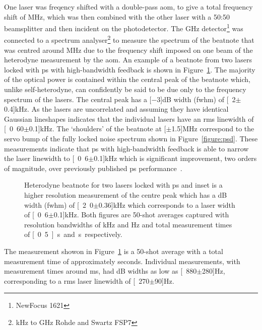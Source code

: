 One laser was freqency shifted with a double-pass \gls{aom}, to give a total frequency shift of \unit[160]{MHz}, which was then combined with the other laser with a 50:50 beamsplitter and then incident on the photodetector.
The \unit[1]{GHz} detector\footnote{NewFocus 1621} was connected to a spectrum analyser\footnote{\unit[9]{kHz} to \unit[7]{GHz} Rohde and Swartz FSP7} to measure the spectrum of the beatnote that was centred around \unit[160]{MHz} due to the frequency shift imposed on one beam of the heterodyne measurement by the \gls{aom}.
An example of a beatnote from two lasers locked with \gls{ps} with high-bandwidth feedback is shown in Figure~\ref{figure:two_laser_beatnote}.
The majority of the optical power is contained within the central peak of the beatnote which, unlike self-heterodyne, can confidently be said to be due only to the frequency spectrum of the lasers.
The central peak has a \unit[$-3$]{dB} width (\gls{fwhm}) of \unit[2$\pm$0.4]{kHz}.
As the lasers are uncorrelated and assuming they have identical Gaussian lineshapes indicates that the individual lasers have an \gls{rms} linewidth of \unit[0.60$\pm$0.1]{kHz}.
The `shoulders' of the beatnote at \unit[$\pm$1.5]{MHz} correspond to the servo bump of the fully locked noise spectrum shown in Figure~\ref{figure:psd}.
These measurements indicate that \gls{ps} with high-bandwidth feedback is able to narrow the laser linewidth to \unit[0.6$\pm$0.1]{kHz} which is significant improvement, two orders of magnitude, over previously published \gls{ps} performance~\cite{torii_laser-phase_2012}.

\begin{figure}
\center

\caption{Heterodyne beatnote for two lasers locked with \gls{ps} and inset is a higher resolution measurement of the centre peak which has a \unit[-3]{dB} width (\gls{fwhm}) of \unit[2.0$\pm$0.36]{kHz} which corresponds to a laser width of \unit[0.6$\pm$0.1]{kHz}.
Both figures are 50-shot averages captured with resolution bandwidths of \unit[30]{kHz} and \unit[100]{Hz} and total measurement times of \unit[0.5]{s} and \unit[2]{s} respectively.}
\label{figure:two_laser_beatnote}
\end{figure}

The measurement showon in Figure~\ref{figure:two_laser_beatnote} is a 50-shot average with a total measurement time of approximately \unit[2]{seconds}.
Individual measurements, with measurement times around \unit[40]{ms}, had \unit[-3]{dB} widths as low as \unit[880$\pm$280]{Hz}, corresponding to a \gls{rms} laser linewidth of \unit[270$\pm$90]{Hz}.




